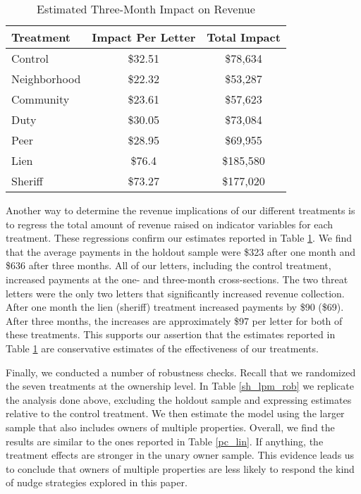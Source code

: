 \documentclass[12pt]{article}
\begin{document}
\begin{table}[htbp]
\caption{Estimated Three-Month Impact on Revenue}\label{sh_rev}
\bigskip
\centering
\begin{tabular}{lcc}
  \hline
Treatment & Impact Per Letter & Total Impact \\ 
  \hline
Control & \$32.51 & \$78,634 \\ 
  Neighborhood & \$22.32 & \$53,287 \\ 
  Community & \$23.61 & \$57,623 \\ 
  Duty & \$30.05 & \$73,084 \\ 
  Peer & \$28.95 & \$69,955 \\ 
  Lien & \$76.4 & \$185,580 \\ 
  Sheriff & \$73.27 & \$177,020 \\ 
   \hline
\end{tabular}
\end{table}

Another way to determine the revenue implications of our different
treatments is to regress the total amount of revenue raised on
indicator variables for each treatment.  These regressions confirm our
estimates reported in Table \ref{sh_rev}. We find that the average
payments in the holdout sample were \$323 after one month and \$636
after three months. All of our letters, including the control
treatment, increased payments at the one- and three-month
cross-sections. The two threat letters were the only two letters that
significantly increased revenue collection. After one month the lien
(sheriff) treatment increased payments by \$90 (\$69). After three
months, the increases are approximately \$97 per letter for both of
these treatments.  This supports our assertion that the estimates
reported in Table \ref{sh_rev} are conservative estimates of the
effectiveness of our treatments.


Finally, we conducted a number of robustness checks. Recall that we
randomized the seven treatments at the ownership level. In Table
\ref{sh_lpm_rob} we replicate the analysis done above, excluding the
holdout sample and expressing estimates relative to the control
treatment. We then estimate the model using the larger sample that
also includes owners of multiple properties. Overall, we find the
results are similar to the ones reported in Table \ref{pc_lin}. If
anything, the treatment effects are stronger in the unary owner
sample. This evidence leads us to conclude that owners of multiple
properties are less likely to respond the kind of nudge strategies
explored in this paper.
\end{document}
